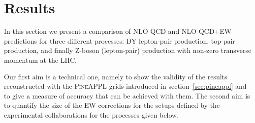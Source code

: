\section{Results}
\label{sec:results}

In this section we present a comparison of NLO QCD and NLO QCD+EW predictions for three different processes: DY lepton-pair production, top-pair production, and finally Z-boson (lepton-pair) production with non-zero transverse momentum at the LHC.

Our first aim is a technical one, namely to show the validity of the results reconstructed with the \textsc{PineAPPL} grids introduced in section~\ref{sec:pineappl} and to give a measure of accuracy that can be achieved with them.
The second aim is to quantify the size of the EW corrections for the setups defined by the experimental collaborations for the processes given below.

